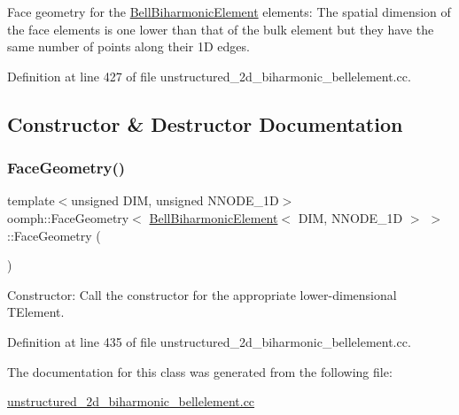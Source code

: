 Face geometry for the \hyperlink{classoomph_1_1BellBiharmonicElement}{Bell\+Biharmonic\+Element} elements\+: The spatial dimension of the face elements is one lower than that of the bulk element but they have the same number of points along their 1D edges. 

Definition at line 427 of file unstructured\+\_\+2d\+\_\+biharmonic\+\_\+bellelement.\+cc.



\subsection{Constructor \& Destructor Documentation}
\mbox{\label{classoomph_1_1FaceGeometry_3_01BellBiharmonicElement_3_01DIM_00_01NNODE__1D_01_4_01_4_a9242ac70d699ed140af2d89299b9cf19}} 
\subsubsection{\texorpdfstring{Face\+Geometry()}{FaceGeometry()}}
{\footnotesize\ttfamily template$<$unsigned D\+IM, unsigned N\+N\+O\+D\+E\+\_\+1D$>$ \\
oomph\+::\+Face\+Geometry$<$ \hyperlink{classoomph_1_1BellBiharmonicElement}{Bell\+Biharmonic\+Element}$<$ D\+IM, N\+N\+O\+D\+E\+\_\+1D $>$ $>$\+::Face\+Geometry (\begin{DoxyParamCaption}{ }\end{DoxyParamCaption})\hspace{0.3cm}{\ttfamily [inline]}}



Constructor\+: Call the constructor for the appropriate lower-\/dimensional T\+Element. 



Definition at line 435 of file unstructured\+\_\+2d\+\_\+biharmonic\+\_\+bellelement.\+cc.



The documentation for this class was generated from the following file\+:\begin{DoxyCompactItemize}
\item 
\hyperlink{unstructured__2d__biharmonic__bellelement_8cc}{unstructured\+\_\+2d\+\_\+biharmonic\+\_\+bellelement.\+cc}\end{DoxyCompactItemize}
